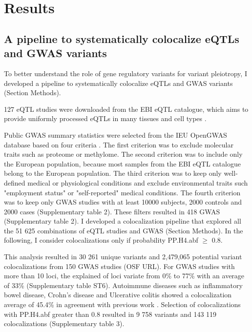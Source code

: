 \section*{Results}\label{s:results}

\subsection*{A pipeline to systematically colocalize eQTLs and GWAS variants}

To better understand the role of gene regulatory variants for variant pleiotropy, I developed a pipeline to systematically colocalize eQTLs and GWAS variants (Section Methods).

127 eQTL studies were downloaded from the EBI eQTL catalogue, which aims to provide uniformly processed eQTLs in many tissues and cell types \citep{2021.Alasoo.Kerimov}.

Public GWAS summary statistics were selected from the IEU OpenGWAS database based on four criteria \citep{2018.Parkinson.Buniello}.
%
The first criterion was to exclude molecular traits such as proteome or methylome.
%	
The second criterion was to include only the European population, because most samples from the EBI eQTL catalogue belong to the European population.
%
The third criterion was to keep only well-defined medical or physiological conditions and exclude environmental traits such "employment status" or "self-reported" medical conditions.
%
The fourth criterion was to keep only GWAS studies with at least 10000 subjects, 2000 controls and 2000 cases (Supplementary table 2).
%
These filters resulted in 418 GWAS (Supplementary table 2).
%
I developed a colocalization pipeline that explored all the 51 625 combinations of eQTL studies and GWAS (Section Methods).
%
In the following, I consider colocalizations only if probability PP.H4.abf $\geq$ 0.8.
%

This analysis resulted in 30 261 unique variants and 2,479,065 potential variant colocalizations from 150 GWAS studies (OSF URL).
%
For GWAS studies with more than 10 loci, the explained of loci variate from 0\% to 77\% with an average of 33\% (Supplementary table ST6).
%
Autoimmune diseases such as inflammatory bowel disease, Crohn's disease and Ulcerative colitis showed a colocalization average of 45.4\% in agreement with previous work \citep{2021.Li.Mu.GenomeBiology.impactcelltype}.
%
Selection of colocalizations with PP.H4.abf greater than 0.8 resulted in 9 758 variants and 143 119 colocalizations (Supplementary table 3).

